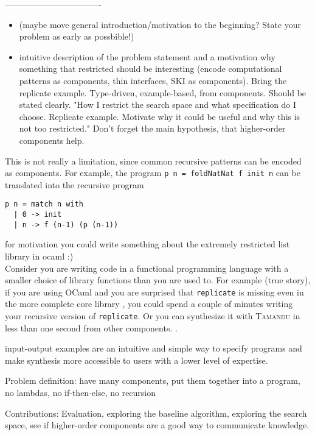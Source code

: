 ----------------------------------

\begin{itemize}
\item (maybe move general introduction/motivation to the beginning? State your problem as early as possbible!)
\item intuitive description of the problem statement and a motivation why something that restricted should be interesting (encode computational patterns as components, thin interfaces, SKI as components). Bring the replicate example. Type-driven, example-based, from components. Should be stated clearly. "How I restrict the search space and what specification do I choose. Replicate example. Motivate why it could be useful and why this is not too restricted." Don't forget the main hypothesis, that higher-order components help.
\end{itemize} 


This is not really a limitation, since common recursive patterns can be encoded as components. For example, the program \lstinline!p n = foldNatNat f init n! can be translated into the recursive program
\begin{lstlisting}[style=plain]
p n = match n with
  | 0 -> init
  | n -> f (n-1) (p (n-1))
\end{lstlisting}  

for motivation you could write something about the extremely restricted list library in ocaml :)\\
Consider you are writing code in a functional programming language with a smaller choice of library functions than you are used to. For example (true story), if you are using OCaml and you are surprised that \lstinline?replicate? is missing even in the more complete core library , you could spend a couple of minutes writing your recursive version of \lstinline?replicate?. Or you can synthesize it with \textsc{Tamandu} in less than one second from other components. .

input-output examples are an intuitive and simple way to specify programs and make synthesis more accessible to users with a lower level of expertise.


Problem definition: have many components, put them together into a program, no lambdas, no if-then-else, no recursion
  

  
  
Contributions: Evaluation, exploring the baseline algorithm, exploring the search space, see if higher-order components are a good way to communicate knowledge.
